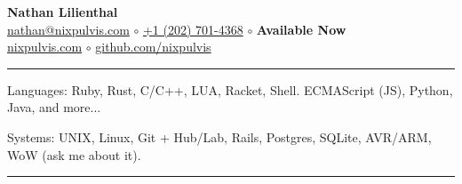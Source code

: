 \documentclass[10pt,letterpaper]{article}
\newenvironment{indentsection}[1]
{\begin{list}{}
  {\setlength{\leftmargin}{#1}} \item[]
}
{\end{list}}
\begin{document}
\begin{center}
  \huge \textbf{Nathan Lilienthal} \\
  \large
  \href{mailto:nathan@nixpulvis.com}{nathan@nixpulvis.com}
  $\circ$
  \href{tel:12027014368}{+1 (202) 701-4368}
  $\circ$
  {\bf Available Now}
  \\
  \url{nixpulvis.com}
  $\circ$
  \url{github.com/nixpulvis}
  \vspace{-0.2em}
\end{center}


\hrule
\begin{indentsection}{\parindent}
\begin{description*}
  \item[Languages:] Ruby, Rust, C/C++, LUA, Racket, Shell. ECMAScript (JS),
  Python, Java, and more...
  \item[Systems:] UNIX, Linux, Git + Hub/Lab, Rails, Postgres, SQLite, AVR/ARM,
  WoW (ask me about it).
\end{description*}
\end{indentsection}


\hrule
\vspace{-0.4em}
\end{document}
